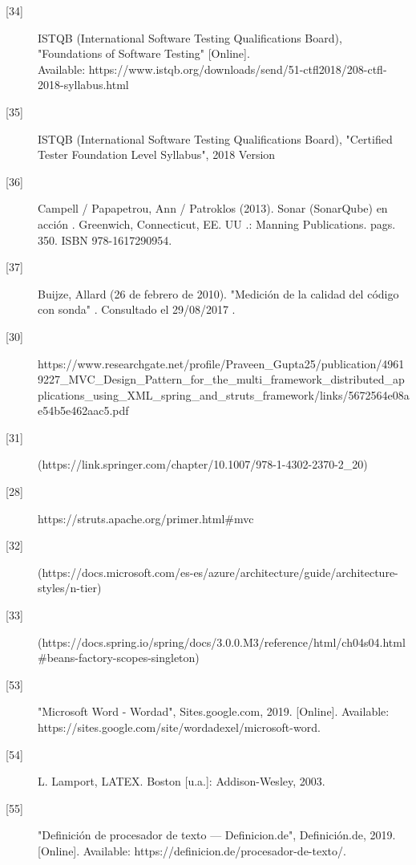 \begin{description}
		\item[\hypertarget{b34}{[34]}] ISTQB (International Software Testing Qualifications Board), "Foundations of Software Testing" [Online].\\ Available: 
		https://www.istqb.org/downloads/send/51-ctfl2018/208-ctfl-2018-syllabus.html
		
		\item[\hypertarget{b35}{[35]}] ISTQB (International Software Testing Qualifications Board), "Certified Tester
		Foundation Level Syllabus", 2018 Version 
		
		\item[\hypertarget{b36}{[36]}] Campell / Papapetrou, Ann / Patroklos (2013). Sonar (SonarQube) en acción . Greenwich, Connecticut, EE. UU .: Manning Publications. pags. 350. ISBN 978-1617290954.
		
		\item[\hypertarget{b37}{[37]}] Buijze, Allard (26 de febrero de 2010). "Medición de la calidad del código con sonda" . Consultado el 29/08/2017 .
				
		\item[\hypertarget{b30}{[30]}] 	https://www.researchgate.net/profile/Praveen\_Gupta25/publication/49619227\_MVC\_Design\_Pattern\_for\_the\_multi\_framework\_distributed\_applications\_using\_XML\_spring\_and\_struts\_framework/links/5672564e08ae54b5e462aac5.pdf
		
		\item[\hypertarget{b31}{[31]}] (https://link.springer.com/chapter/10.1007/978-1-4302-2370-2\_20)
		
		\item[\hypertarget{b28}{[28]}] https://struts.apache.org/primer.html\#mvc
		
		\item[\hypertarget{b32}{[32]}] (https://docs.microsoft.com/es-es/azure/architecture/guide/architecture-styles/n-tier)
		\item[\hypertarget{b33}{[33]}](https://docs.spring.io/spring/docs/3.0.0.M3/reference/html/ch04s04.html\#beans-factory-scopes-singleton)
		
		\item[\hypertarget{b53}{[53]}]"Microsoft Word - Wordad", Sites.google.com, 2019. [Online]. Available: https://sites.google.com/site/wordadexel/microsoft-word. 
		
		\item[\hypertarget{b54}{[54]}]L. Lamport, LATEX. Boston [u.a.]: Addison-Wesley, 2003.
		
		\item[\hypertarget{b55}{[55]}] "Definición de procesador de texto — Definicion.de", Definición.de, 2019. [Online]. Available: https://definicion.de/procesador-de-texto/. 
		

\end{description}
